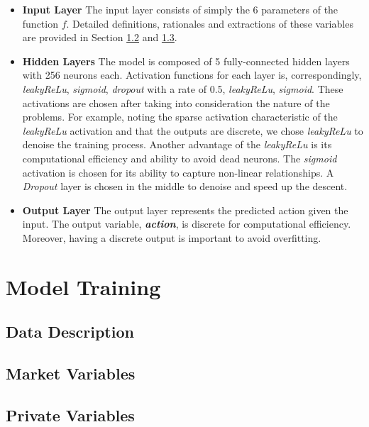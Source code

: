 \documentclass[12pt]{extarticle}
\begin{document}
\begin{itemize}
\item \textbf{Input Layer} The input layer consists of simply the 6 parameters of the function $f$.
Detailed definitions, rationales and extractions of these variables are
provided in Section \ref{market-variables} and \ref{private-variables}.

\item \textbf{Hidden Layers} The model is composed of 5 fully-connected hidden layers with
256 neurons each. Activation functions for each layer is, correspondingly,
\textit{leakyReLu},
\textit{sigmoid}, \textit{dropout} with a rate of 0.5,
\textit{leakyReLu}, \textit{sigmoid}. These activations are
chosen after taking into consideration the nature of the
problems. For example, noting the sparse activation characteristic of
the \textit{leakyReLu} activation and that the outputs are discrete, we chose \textit{leakyReLu}
to denoise the training process. Another advantage of the \textit{leakyReLu}
is its computational efficiency and ability to avoid dead neurons.
The \textit{sigmoid} activation is chosen for its ability to capture
non-linear relationships. A \textit{Dropout} layer is chosen
in the middle to denoise and speed up the descent. \\

\item \textbf{Output Layer} The output layer represents the predicted action given
the input. The output variable, \textit{\textbf{action}}, is discrete for computational
efficiency. Moreover, having a discrete output is important to avoid overfitting.

\end{itemize}


\section{Model Training}
\subsection{Data Description}

\subsection{Market Variables} \label{market-variables}

\subsection{Private Variables} \label{private-variables}
\end{document}
